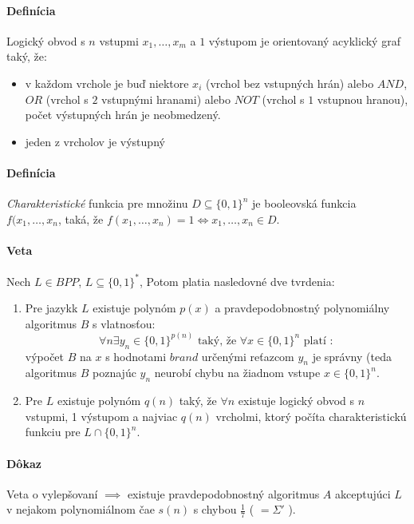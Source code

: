\documentclass{article}
\begin{document}
\paragraph{Definícia} Logický obvod s $n$ vstupmi $x_1, \ldots, x_m$ a
$1$ výstupom je orientovaný acyklický graf taký, že:
\begin{itemize}
	\item v každom vrchole je buď niektore $x_i$ (vrchol bez vstupných hrán)
	alebo $AND$, $OR$ (vrchol s $2$ vstupnými hranami) alebo $NOT$ (vrchol s
	$1$ vstupnou hranou), počet výstupných hrán je neobmedzený.
	\item jeden z vrcholov je výstupný
\end{itemize}

\paragraph{Definícia} \emph {Charakteristické} funkcia pre množinu $D \subseteq
\{ 0,1 \}^n$ je booleovská funkcia $f(x_1,\ldots ,x_n$, taká, že $f(x_1, \ldots,
x_n) = 1 \iff x_1, \ldots,x_n \in D$.

\paragraph{Veta} Nech $L \in BPP$, $L\subseteq \{0,1\}^*$, Potom platia
nasledovné dve tvrdenia:
\begin{enumerate}
	\item Pre jazykk $L$ existuje polynóm $p(x)$ a pravdepodobnostný
	polynomiálny algoritmus $B$ s vlatnosťou:
	$$ \forall n \exists y_n \in \{ 0, 1\}^{p(n)} \mbox{ taký, že }  \forall
	x \in \{0,1\}^n \mbox{ platí }:$$
	výpočet $B$ na $x$ s hodnotami $brand$ určenými reťazcom $y_n$ je
	správny (teda algoritmus $B$ poznajúc $y_n$ neurobí chybu na žiadnom
	vstupe $x \in \{ 0,1 \}^n$.
	\item Pre $L$ existuje polynóm $q(n)$ taký, že $\forall n$ existuje
	logický obvod s $n$ vstupmi, 1 výstupom a najviac $q(n)$ vrcholmi, ktorý
	počíta charakteristickú funkciu pre $L \cap \{0,1\}^n$.
\end{enumerate}

\paragraph{Dôkaz} Veta o vylepšovaní $\implies$ existuje pravdepodobnostný
algoritmus $A$ akceptujúci $L$ v nejakom polynomiálnom čae $s(n)$ s chybou
$\frac{1}{7}$ ( $= \Sigma'$ ).
\end{document}
